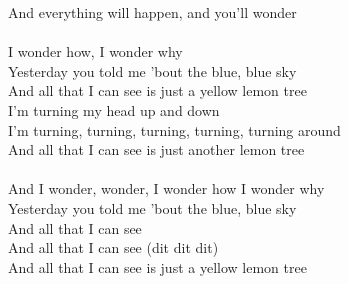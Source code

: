 And everything will happen, and you'll wonder\\
\\
I wonder how, I wonder why\\
Yesterday you told me 'bout the blue, blue sky\\
And all that I can see is just a yellow lemon tree\\
I'm turning my head up and down\\
I'm turning, turning, turning, turning, turning around\\
And all that I can see is just another lemon tree\\
\\
And I wonder, wonder, I wonder how I wonder why\\
Yesterday you told me 'bout the blue, blue sky\\
And all that I can see \\
And all that I can see (dit dit dit)\\
And all that I can see is just a yellow lemon tree\\
